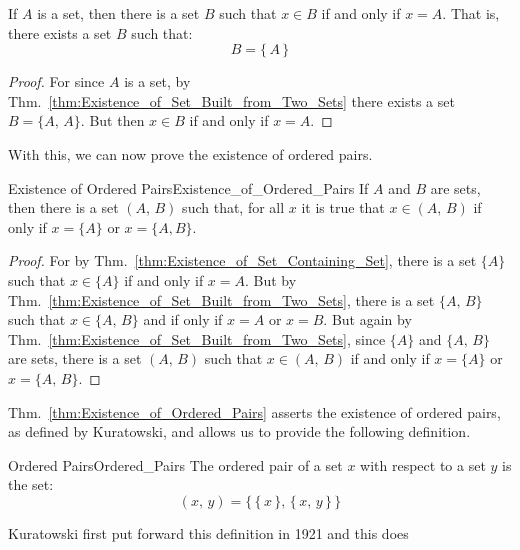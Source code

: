         \begin{theorem}
            \label{thm:Existence_of_Set_Containing_Set}%
            If $A$ is a set, then there is a set $B$ such that $x\in{B}$ if
            and only if $x=A$. That is, there exists a set $B$ such that:
            \begin{equation}
                B=\{\,A\,\}
            \end{equation}
        \end{theorem}
        \begin{proof}
            For since $A$ is a set, by
            Thm.~\ref{thm:Existence_of_Set_Built_from_Two_Sets} there exists
            a set $B=\{A,\,A\}$. But then $x\in{B}$ if and only if $x=A$.
        \end{proof}
        With this, we can now prove the existence of ordered pairs.
        \begin{ltheorem}{Existence of Ordered Pairs}{Existence_of_Ordered_Pairs}
            If $A$ and $B$ are sets, then there is a set $(A,\,B)$ such that,
            for all $x$ it is true that $x\in(A,\,B)$ if only if $x=\{A\}$
            or $x=\{A,B\}$.
        \end{ltheorem}
        \begin{proof}
            For by Thm.~\ref{thm:Existence_of_Set_Containing_Set}, there is
            a set $\{A\}$ such that $x\in\{A\}$ if and only if $x=A$.
            But by Thm.~\ref{thm:Existence_of_Set_Built_from_Two_Sets}, there
            is a set $\{A,\,B\}$ such that $x\in\{A,\,B\}$ and if only
            if $x=A$ or $x=B$. But again by
            Thm.~\ref{thm:Existence_of_Set_Built_from_Two_Sets}, since
            $\{A\}$ and $\{A,\,B\}$ are sets, there is a set $(A,\,B)$ such
            that $x\in(A,\,B)$ if and only if $x=\{A\}$ or $x=\{A,\,B\}$.
        \end{proof}
        Thm.~\ref{thm:Existence_of_Ordered_Pairs} asserts the existence of
        ordered pairs, as defined by Kuratowski, and allows us to provide
        the following definition.
        \begin{fdefinition}{Ordered Pairs}{Ordered_Pairs}
            The \gls{ordered pair} of a \gls{set} $x$ with respect to a set
            $y$ is the set:
            \begin{equation*}
                (x,\,y)=\big\{\,\{\,x\,\},\,\{\,x,\,y\,\}\,\big\}
            \end{equation*}
        \end{fdefinition}
        Kuratowski first put forward this definition in 1921 and this does
